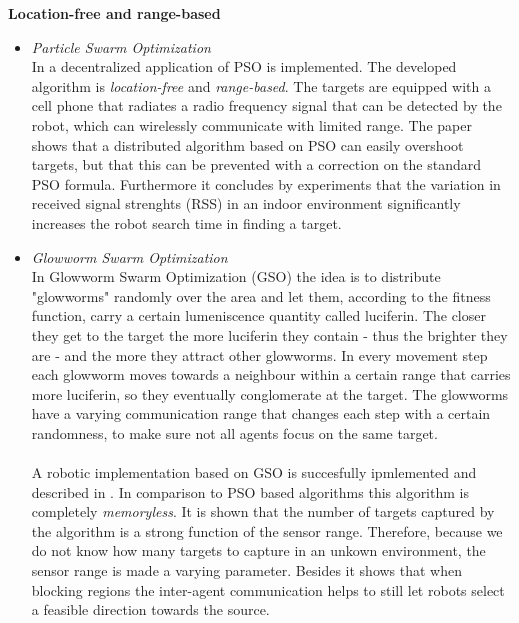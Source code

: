 	\textbf{Location-free and range-based}
	\begin{itemize}
		\item
		\textit{Particle Swarm Optimization}\\
		In \cite{derr2009multi} a decentralized application of PSO is implemented.
		The developed algorithm is \emph{location-free} and \emph{range-based}.
		The targets are equipped with a cell phone that radiates a radio frequency signal that can be detected by the robot, which can wirelessly communicate with limited range.
		The paper shows that a distributed algorithm based on PSO can easily overshoot targets, but that this can be prevented with a correction on the standard PSO formula.
		Furthermore it concludes by experiments that the variation in received signal strenghts (RSS) in an indoor environment significantly increases the robot search time in finding a target.

		\item
		\textit{Glowworm Swarm Optimization}\\
		In Glowworm Swarm Optimization (GSO) the idea is to distribute "glowworms" randomly over the area and let them, according to the fitness function, carry a certain lumeniscence quantity called luciferin. 
		The closer they get to the target the more luciferin they contain - thus the brighter they are - and the more they attract other glowworms. 
		In every movement step each glowworm moves towards a neighbour within a certain range that carries more luciferin, so they eventually conglomerate at the target. 
		The glowworms have a varying communication range that changes each step with a certain randomness, to make sure not all agents focus on the same target. \cite{krishnanand2006glowworm}\\
		\\
		A robotic implementation based on GSO is succesfully ipmlemented and described in \cite{krishnanand2005detection}.
		In comparison to PSO based algorithms this algorithm is completely \emph{memoryless}.
		It is shown that the number of targets captured by the algorithm is a strong function of the sensor range.
		Therefore, because we do not know how many targets to capture in an unkown environment, the sensor range is made a varying parameter.
		Besides it shows that when blocking regions the inter-agent communication helps to still let robots select a feasible direction towards the source.

	\end{itemize}

